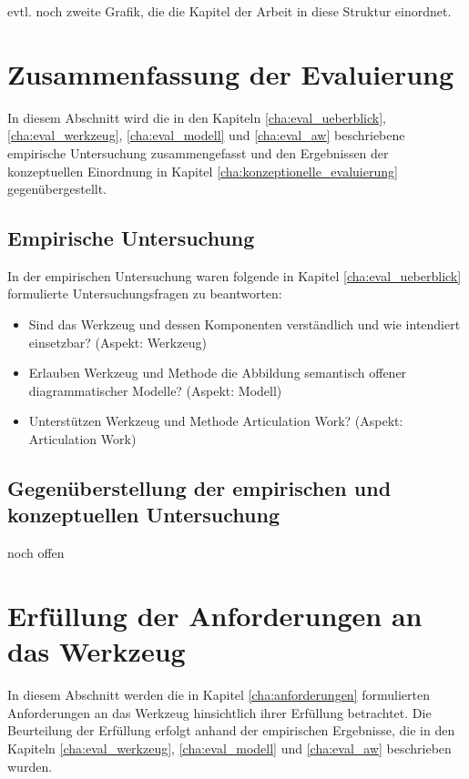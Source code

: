evtl. noch zweite Grafik, die die Kapitel der Arbeit in diese Struktur einordnet.


\section{Zusammenfassung der Evaluierung}

In diesem Abschnitt wird die in den Kapiteln \ref{cha:eval_ueberblick}, \ref{cha:eval_werkzeug}, \ref{cha:eval_modell} und \ref{cha:eval_aw} beschriebene empirische Untersuchung zusammengefasst und den Ergebnissen der konzeptuellen Einordnung in Kapitel \ref{cha:konzeptionelle_evaluierung} gegenübergestellt.

\subsection{Empirische Untersuchung}

In der empirischen Untersuchung waren folgende in Kapitel \ref{cha:eval_ueberblick} formulierte Untersuchungsfragen zu beantworten:

\begin{itemize}
 \item Sind das Werkzeug und dessen Komponenten verständlich und wie intendiert einsetzbar? (Aspekt: Werkzeug)
 \item Erlauben Werkzeug und Methode die Abbildung semantisch offener diagrammatischer Modelle? (Aspekt: Modell)
 \item Unterstützen Werkzeug und Methode Articulation Work? (Aspekt: Articulation Work)
\end{itemize}

\subsection{Gegenüberstellung der empirischen und konzeptuellen Untersuchung}

noch offen

\section{Erfüllung der Anforderungen an das Werkzeug}

In diesem Abschnitt werden die in Kapitel \ref{cha:anforderungen} formulierten Anforderungen an das Werkzeug hinsichtlich ihrer Erfüllung betrachtet. Die Beurteilung der Erfüllung erfolgt anhand der empirischen Ergebnisse, die in den Kapiteln \ref{cha:eval_werkzeug}, \ref{cha:eval_modell} und \ref{cha:eval_aw} beschrieben wurden.


